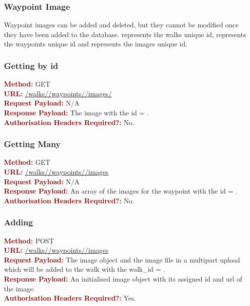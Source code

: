 \documentclass[11pt,a4paper]{report}
\begin{document}
\subsubsection{Waypoint Image}
Waypoint images can be added and deleted, but they cannot be modified once they have been added to the database.  represents the walks unique id,  represents the waypoints unique id and  represents the images unique id. 

\subsubsection{Getting by id}
\textbf{\textcolor{Maroon}{Method:}} GET\\
\textbf{\textcolor{Maroon}{URL:}} \url{/walks/}\url{/waypoints/}\url{/images/}\\
\textbf{\textcolor{Maroon}{Request Payload:}} N/A\\
\textbf{\textcolor{Maroon}{Response Payload:}} The image with the id = .\\
\textbf{\textcolor{Maroon}{Authorisation Headers Required?:}} No.

\subsubsection{Getting Many}
\textbf{\textcolor{Maroon}{Method:}} GET\\
\textbf{\textcolor{Maroon}{URL:}} \url{/walks/}\url{/waypoints/}\url{/images}\\
\textbf{\textcolor{Maroon}{Request Payload:}} N/A\\
\textbf{\textcolor{Maroon}{Response Payload:}} An array of the images for the waypoint with the id = .\\
\textbf{\textcolor{Maroon}{Authorisation Headers Required?:}} No.

\subsubsection{Adding}
\textbf{\textcolor{Maroon}{Method:}} POST\\
\textbf{\textcolor{Maroon}{URL:}} \url{/walks/}\url{/waypoints/}\url{/images}\\
\textbf{\textcolor{Maroon}{Request Payload:}} The image object and the image file in a multipart upload which will be added to the walk with the walk\_id = .\\
\textbf{\textcolor{Maroon}{Response Payload:}} An initialised image object with its assigned id and url of the image.\\
\textbf{\textcolor{Maroon}{Authorisation Headers Required?:}} Yes.
\end{document}
